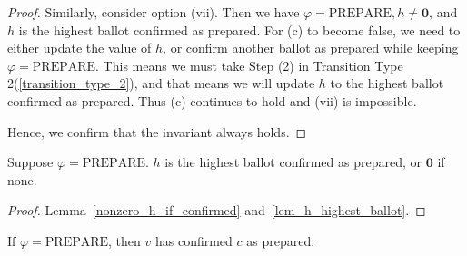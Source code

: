 \begin{proof}
    Similarly, consider option (vii).
    Then we have $\varphi = \text{PREPARE}, h \ne \textbf{0}$, and $h$ is the highest ballot confirmed as prepared.
    For (c) to become false, we need to either update the value of $h$, or confirm another ballot as prepared while keeping $\varphi = \text{PREPARE}$.
    This means we must take Step (2) in Transition Type 2(\ref{transition_type_2}), and that means we will update $h$ to the highest ballot confirmed as prepared.
    Thus (c) continues to hold and (vii) is impossible.

    Hence, we confirm that the invariant always holds.
\end{proof}

\begin{thm}
    Suppose $\varphi = \text{PREPARE}$.
    $h$ is the highest ballot confirmed as prepared, or $\textbf{0}$ if none.
\end{thm}

\begin{proof}
    Lemma~\ref{nonzero_h_if_confirmed} and~\ref{lem_h_highest_ballot}.
\end{proof}


\begin{lem}
    If $\varphi = \text{PREPARE}$, then $v$ has confirmed $c$ as prepared.
\end{lem}

